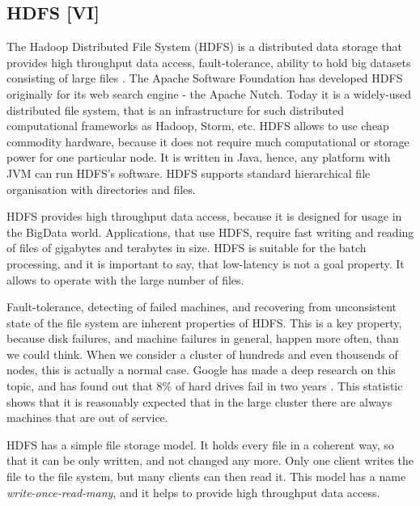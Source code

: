\subsection{HDFS [VI]}

The Hadoop Distributed File System (HDFS) is a distributed data storage that provides high throughput data access, fault-tolerance, ability to hold big datasets consisting of large files \cite{HDFSArchitecture1} \cite{HDFSArchitecture2}.
The Apache Software Foundation has developed HDFS originally for its web search engine - the Apache Nutch.
Today it is a widely-used distributed file system, that is an infrastructure for such distributed computational frameworks as Hadoop, Storm, etc.
HDFS allows to use cheap commodity hardware, because it does not require much computational or storage power for one particular node.
It is written in Java, hence, any platform with JVM \cite{JVM} can run HDFS's software.
HDFS supports standard hierarchical file organisation with directories and files.


HDFS provides high throughput data access, because it is designed for usage in the BigData world.
Applications, that use HDFS, require fast writing and reading of files of gigabytes and terabytes in size.
HDFS is suitable for the batch processing, and it is important to say, that low-latency is not a goal property.
It allows to operate with the large number of files.

Fault-tolerance, detecting of failed machines, and recovering from unconsistent state of the file system are inherent properties of HDFS.
This is a key property, because disk failures, and machine failures in general, happen more often, than we could think.
When we consider a cluster of hundreds and even thousends of nodes, this is actually a normal case.
Google has made a deep research on this topic, and has found out that 8\% of hard drives fail in two years \cite{Pinheiro2007}.
This statistic shows that it is reasonably expected that in the large cluster there are always machines that are out of service.

HDFS has a simple file storage model.
It holds every file in a coherent way, so that it can be only written, and not changed any more.
Only one client writes the file to the file system, but many clients can then read it.
This model has a name \textit{write-once-read-many}, and it helps to provide high throughput data access.

